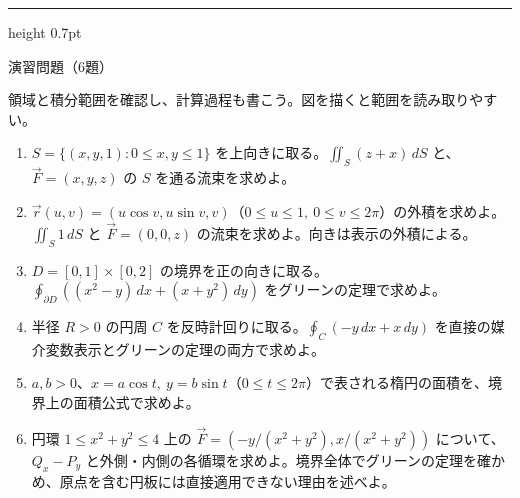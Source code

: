 \documentclass[a4paper,10pt,pdflatex,ja=standard,jafont=ipaex-type1,
  magstyle=real,scale=1]{bxjsarticle}
\newcommand{\topic}[1]{\par\vspace{5pt}%
  {\large\sffamily\mdseries\color{accent}#1}\par\vspace{2pt}}
\newenvironment{problems}
  {\begin{enumerate}[leftmargin=2em,itemsep=3pt,topsep=3pt,parsep=0pt,
    font=\color{accent}]}
  {\end{enumerate}}
\newcommand{\problemspace}{\par\vspace{5mm}}
\newcommand{\exercises}{%
  {\color{accent}\hrule height 0.7pt}\vspace{3pt}%
  \topic{演習問題（6題）}%
  {\small 領域と積分範囲を確認し、計算過程も書こう。図を描くと範囲を読み取りやすい。}\par}
\begin{document}
\noindent\begin{minipage}[b][0.5\textheight][t]{\linewidth}
\exercises
\begin{problems}
\item $S=\{(x,y,1):0\le x,y\le1\}$ を上向きに取る。$\iint_S(z+x)\,dS$ と、$\vec F=(x,y,z)$ の $S$ を通る流束を求めよ。
\problemspace

\item $\vec r(u,v)=(u\cos v,u\sin v,v)$（$0\le u\le1,\ 0\le v\le2\pi$）の外積を求めよ。$\iint_S1\,dS$ と $\vec F=(0,0,z)$ の流束を求めよ。向きは表示の外積による。
\problemspace

\item $D=[0,1]\times[0,2]$ の境界を正の向きに取る。$\oint_{\partial D}((x^2-y)\,dx+(x+y^2)\,dy)$ をグリーンの定理で求めよ。
\problemspace

\item 半径 $R>0$ の円周 $C$ を反時計回りに取る。$\oint_C(-y\,dx+x\,dy)$ を直接の媒介変数表示とグリーンの定理の両方で求めよ。
\problemspace

\item $a,b>0$、$x=a\cos t,\ y=b\sin t$（$0\le t\le2\pi$）で表される楕円の面積を、境界上の面積公式で求めよ。
\problemspace

\item 円環 $1\le x^2+y^2\le4$ 上の $\vec F=(-y/(x^2+y^2),x/(x^2+y^2))$ について、$Q_x-P_y$ と外側・内側の各循環を求めよ。境界全体でグリーンの定理を確かめ、原点を含む円板には直接適用できない理由を述べよ。
\problemspace
\end{problems}
\end{minipage}
\end{document}
